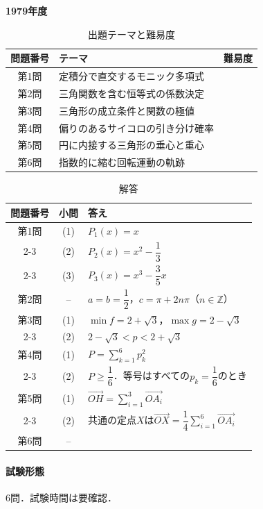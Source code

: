 \documentclass[../../main.tex]{subfiles}
\begin{document}
\begin{center}
  {\fontsize{48pt}{58pt}\selectfont \textbf{1979}\normalsize\textbf{年度}}
\end{center}

\begin{table}[htb]
  \centering
  \caption{出題テーマと難易度}
  \begin{tabular}{|c|p{9cm}|c|}
    \hline
    \textbf{問題番号} & \textbf{テーマ} & \textbf{難易度} \\
    \hline
    第1問 & 定積分で直交するモニック多項式 & \\
    \hline
    第2問 & 三角関数を含む恒等式の係数決定 & \\
    \hline
    第3問 & 三角形の成立条件と関数の極値 & \\
    \hline
    第4問 & 偏りのあるサイコロの引き分け確率 & \\
    \hline
    第5問 & 円に内接する三角形の垂心と重心 & \\
    \hline
    第6問 & 指数的に縮む回転運動の軌跡 & \\
    \hline
  \end{tabular}
\end{table}

\begin{table}[htb]
  \centering
  \caption{解答}
  \renewcommand{\arraystretch}{1.4}
  \begin{tabular}{|c|c|p{9cm}|}
    \hline
    \textbf{問題番号} & \textbf{小問} & \textbf{答え} \\
    \hline
    第1問 & (1) & $P_1(x)=x$ \\
    \cline{2-3}
    & (2) & $P_2(x)=x^2-\dfrac{1}{3}$ \\
    \cline{2-3}
    & (3) & $P_3(x)=x^3-\dfrac{3}{5}x$ \\
    \hline
    第2問 & -- & $a=b=\dfrac{1}{2}$，$c=\pi+2n\pi$（$n\in\mathbb{Z}$） \\
    \hline
    第3問 & (1) & $\min f=2+\sqrt{3}$，$\max g=2-\sqrt{3}$ \\
    \cline{2-3}
    & (2) & $2-\sqrt{3}<p<2+\sqrt{3}$ \\
    \hline
    第4問 & (1) & $P=\sum_{k=1}^{6}p_k^2$ \\
    \cline{2-3}
    & (2) & $P\ge\dfrac{1}{6}$．等号はすべての$p_k=\dfrac{1}{6}$のとき \\
    \hline
    第5問 & (1) & $\overrightarrow{OH}=\sum_{i=1}^{3}\overrightarrow{OA_i}$ \\
    \cline{2-3}
    & (2) & 共通の定点$X$は$\overrightarrow{OX}=\dfrac{1}{4}\sum_{i=1}^{6}\overrightarrow{OA_i}$ \\
    \hline
    第6問 & -- &  \\
    \hline
  \end{tabular}
\end{table}

\paragraph{試験形態}
6問．試験時間は要確認．
\end{document}
